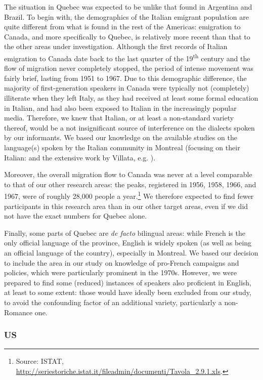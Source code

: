 \documentclass[output=paper,hidelinks]{langscibook}
\begin{document}
The situation in Quebec was expected to be unlike that found in Argentina and Brazil. To begin with, the demographics of the Italian emigrant population are quite different from what is found in the rest of the Americas: emigration to Canada, and more specifically to Quebec, is relatively more recent than that to the other areas under investigation. Although the first records of Italian emigration to Canada date back to the last quarter of the 19\textsuperscript{th} century and the flow of migration never completely stopped, the period of intense movement was fairly brief, lasting from 1951 to 1967. Due to this demographic difference, the majority of first-generation speakers in Canada were typically not (completely) illiterate when they left Italy, as they had received at least some formal education in Italian, and had also been exposed to Italian in the increasingly popular media. Therefore, we knew that Italian, or at least a non-standard variety thereof, would be a not insignificant source of interference on the dialects spoken by our informants. We based our knowledge on the available studies on the language(s) spoken by the Italian community in Montreal (focusing on their Italian: \citealt{Reinke2014} and the extensive work by Villata, e.g. \citealt{Villata2010}).

Moreover, the overall migration flow to Canada was never at a level comparable to that of our other research areas: the peaks, registered in 1956, 1958, 1966, and 1967, were of roughly 28,000 people a year.\footnote{Source: ISTAT, \url{http://seriestoriche.istat.it/fileadmin/documenti/Tavola\_2.9.1.xls}.} We therefore expected to find fewer participants in this research area than in our other target areas, even if we did not have the exact numbers for Quebec alone.

Finally, some parts of Quebec are \textit{de facto} bilingual areas: while French is the only official language of the province, English is widely spoken (as well as being an official language of the country), especially in Montreal. We based our decision to include the area in our study on knowledge of pro-French campaigns and policies, which were particularly prominent in the 1970s. However, we were prepared to find some (reduced) instances of speakers also proficient in English, at least to some extent: those would have ideally been excluded from our study, to avoid the confounding factor of an additional variety, particularly a non-Romance one.

\subsubsection{US}\label{sec:andriani:2.1.4}
\end{document}
